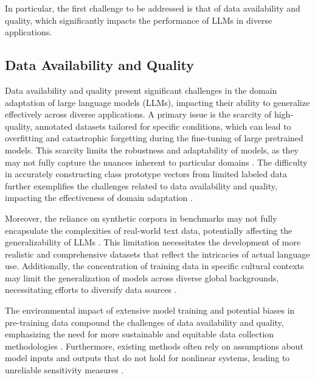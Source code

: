In particular, the first challenge to be addressed is that of data availability and quality, which significantly impacts the performance of LLMs in diverse applications. 







\subsection{Data Availability and Quality} \label{subsec:Data Availability and Quality}



Data availability and quality present significant challenges in the domain adaptation of large language models (LLMs), impacting their ability to generalize effectively across diverse applications. A primary issue is the scarcity of high-quality, annotated datasets tailored for specific conditions, which can lead to overfitting and catastrophic forgetting during the fine-tuning of large pretrained models. This scarcity limits the robustness and adaptability of models, as they may not fully capture the nuances inherent to particular domains \cite{kaur2024cropcontextwiserobuststatic}. The difficulty in accurately constructing class prototype vectors from limited labeled data further exemplifies the challenges related to data availability and quality, impacting the effectiveness of domain adaptation \cite{yamshchikov2020styletransferparaphraselookingsensible}.



Moreover, the reliance on synthetic corpora in benchmarks may not fully encapsulate the complexities of real-world text data, potentially affecting the generalizability of LLMs \cite{yamshchikov2020styletransferparaphraselookingsensible}. This limitation necessitates the development of more realistic and comprehensive datasets that reflect the intricacies of actual language use. Additionally, the concentration of training data in specific cultural contexts may limit the generalization of models across diverse global backgrounds, necessitating efforts to diversify data sources \cite{thapliyal2022crossmodal3600massivelymultilingualmultimodal}.



The environmental impact of extensive model training and potential biases in pre-training data compound the challenges of data availability and quality, emphasizing the need for more sustainable and equitable data collection methodologies \cite{pandy2024advancementsroboticsprocessautomation}. Furthermore, existing methods often rely on assumptions about model inputs and outputs that do not hold for nonlinear systems, leading to unreliable sensitivity measures \cite{dimov2017multidimensionalsensitivityanalysislargescale}.



